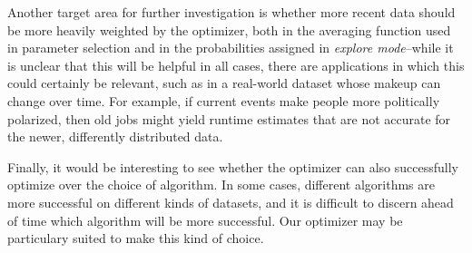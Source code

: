 Another target area for further investigation is whether more recent
data should be more heavily weighted by the optimizer, both in the
averaging function used in parameter selection and in the probabilities
assigned in {\em explore mode}--while it is unclear that this will be 
helpful in all cases, there are applications in which this could certainly
be relevant, such as in a real-world dataset whose makeup can change
over time. For example, if current events make people more politically
polarized, then old jobs might yield runtime estimates that are not
accurate for the newer, differently distributed data. 

Finally, it would be interesting to see whether the optimizer can also 
successfully optimize over the choice of algorithm. In some cases,
different algorithms are more successful on different kinds of datasets, 
and it is difficult to discern ahead of time which algorithm will be more
successful. Our optimizer may be particulary suited to make this kind of
choice.
